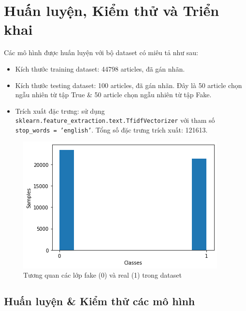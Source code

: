 \documentclass[12pt]{article}
\begin{document}
\section{Huấn luyện, Kiểm thử và Triển khai}
Các mô hình được huấn luyện với bộ dataset có miêu tả như sau:
\begin{itemize}
	\item Kích thước training dataset: 44798 articles, đã gán nhãn.
	\item Kích thước testing dataset: 100 articles, đã gán nhãn. Đây là 50 article chọn ngẫu nhiên từ tập True \& 50 article chọn ngẫu nhiên từ tập Fake.
	\item Trích xuất đặc trưng: sử dụng \texttt{sklearn.feature\_extraction.text.TfidfVectorizer} với tham số \texttt{stop\_words = 'english'}. Tổng số đặc trưng trích xuất: 121613.
\end{itemize}
\begin{figure}[H]
	\centering
	\includegraphics[scale=.8]{img/data-summerise.png}
	\caption{Tương quan các lớp fake (0) và real (1) trong dataset}
	\label{fig:real_fake_in_train}
\end{figure}

\subsection{Huấn luyện \& Kiểm thử các mô hình}
\end{document}
